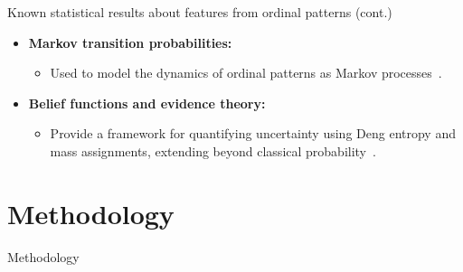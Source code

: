 \documentclass{beamer}
\begin{document}
\begin{frame}{Known statistical results about features from ordinal patterns (cont.)}
	\begin{itemize}
		\item \textbf{Markov transition probabilities:}
		\begin{itemize}
			\item Used to model the dynamics of ordinal patterns as Markov processes~\cite{Sakellariou2019}.
		\end{itemize}
		\item \textbf{Belief functions and evidence theory:}
		\begin{itemize}
			\item Provide a framework for quantifying uncertainty using Deng entropy and mass assignments, extending beyond classical probability~\cite{Xie2025}.
		\end{itemize}
	\end{itemize}
\end{frame}


\section{Methodology}

\begin{frame}
	\begin{center}
		\alert{Methodology}
	\end{center}
\end{frame}

\end{document}

